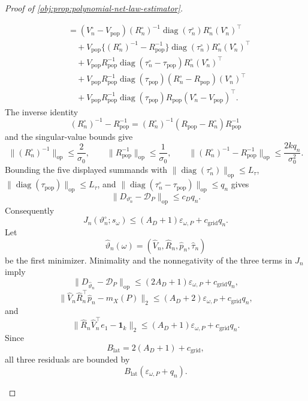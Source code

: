 \begin{proof}[Proof of \cref{obj:prop:polynomial-net-law-estimator}]
\begin{enumerate}
\[\begin{aligned}
&=(V_n^\circ-V_{\mathrm{pop}})(R_n^\circ)^{-1}\operatorname{diag}(\tau_n^\circ)R_n^\circ(V_n^\circ)^\top\\
&\quad+V_{\mathrm{pop}}\{(R_n^\circ)^{-1}-R_{\mathrm{pop}}^{-1}\}\operatorname{diag}(\tau_n^\circ)R_n^\circ(V_n^\circ)^\top\\
&\quad+V_{\mathrm{pop}}R_{\mathrm{pop}}^{-1}\operatorname{diag}(\tau_n^\circ-\tau_{\mathrm{pop}})R_n^\circ(V_n^\circ)^\top\\
&\quad+V_{\mathrm{pop}}R_{\mathrm{pop}}^{-1}\operatorname{diag}(\tau_{\mathrm{pop}})(R_n^\circ-R_{\mathrm{pop}})(V_n^\circ)^\top\\
&\quad+V_{\mathrm{pop}}R_{\mathrm{pop}}^{-1}\operatorname{diag}(\tau_{\mathrm{pop}})R_{\mathrm{pop}}(V_n^\circ-V_{\mathrm{pop}})^\top .
\end{aligned}
\]
The inverse identity
\[
(R_n^\circ)^{-1}-R_{\mathrm{pop}}^{-1}
=
(R_n^\circ)^{-1}(R_{\mathrm{pop}}-R_n^\circ)R_{\mathrm{pop}}^{-1}
\]
and the singular-value bounds give
\[
\|(R_n^\circ)^{-1}\|_{\mathrm{op}}\le\frac{2}{\sigma_0},
\qquad
\|R_{\mathrm{pop}}^{-1}\|_{\mathrm{op}}\le\frac1{\sigma_0},
\qquad
\|(R_n^\circ)^{-1}-R_{\mathrm{pop}}^{-1}\|_{\mathrm{op}}
\le\frac{2kq_n}{\sigma_0^2}.
\]
Bounding the five displayed summands with
\(\|\operatorname{diag}(\tau_n^\circ)\|_{\mathrm{op}}\le L_\tau\),
\(\|\operatorname{diag}(\tau_{\mathrm{pop}})\|_{\mathrm{op}}\le L_\tau\), and
\(\|\operatorname{diag}(\tau_n^\circ-\tau_{\mathrm{pop}})\|_{\mathrm{op}}\le q_n\)
gives
\[
\|D_{\vartheta_n^\circ}-\mathcal D_P\|_{\mathrm{op}}\le c_Dq_n.
\]
Consequently
\[
J_n(\vartheta_n^\circ;s_\omega)
\le
(A_D+1)\varepsilon_{\omega,P}+c_{\mathrm{grid}}q_n .
\]
Let
\[
\widehat\vartheta_n(\omega)
=(\widehat V_n,\widehat R_n,\widehat p_n,\widehat\tau_n)
\]
be the first minimizer.  Minimality and the nonnegativity of the three terms in \(J_n\) imply
\[
\|D_{\widehat\vartheta_n}-\mathcal D_P\|_{\mathrm{op}}
\le(2A_D+1)\varepsilon_{\omega,P}+c_{\mathrm{grid}}q_n,
\]
\[
\|\widehat V_n\widehat R_n^\top\widehat p_n-m_X(P)\|_2
\le(A_D+2)\varepsilon_{\omega,P}+c_{\mathrm{grid}}q_n,
\]
and
\[
\|\widehat R_n\widehat V_n^\top e_1-\mathbf1_k\|_2
\le(A_D+1)\varepsilon_{\omega,P}+c_{\mathrm{grid}}q_n.
\]
Since
\[
B_{\mathrm{lat}}=2(A_D+1)+c_{\mathrm{grid}},
\]
all three residuals are bounded by
\[
B_{\mathrm{lat}}(\varepsilon_{\omega,P}+q_n).
\] %


\end{enumerate}
\end{proof}
